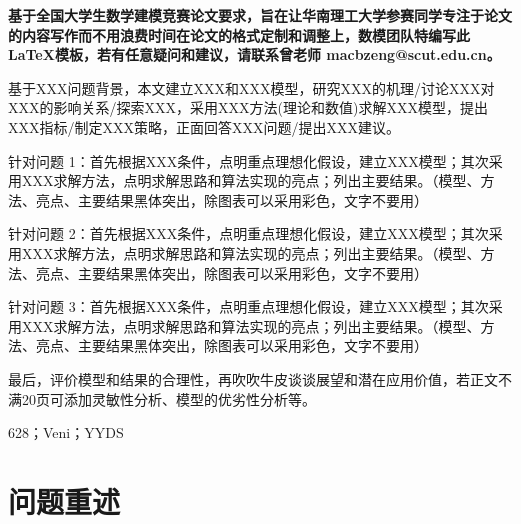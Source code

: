 \documentclass[12pt,utf8]{article}
\begin{document}

\begin{center} 
   \bfseries{}
   \vspace{2ex}
   
   \bfseries{}
\end{center}


\textbf{基于全国大学生数学建模竞赛论文要求，旨在让华南理工大学参赛同学专注于论文的内容写作而不用浪费时间在论文的格式定制和调整上，数模团队特编写此 \LaTeX 模板，若有任意疑问和建议，请联系曾老师 macbzeng@scut.edu.cn。\color{blue}{Veni修改内容：修正原模板中的dkgreen颜色报错；修正原模板中插入代码的时候单行代码过长而无法显示；改变附录代码插入格式，改为lstinputlisting，直接输入文件名，不必再CV；改变文献引用格式，采用gbt7714-2015格式，同时修正了开源模板中的学位论文出现[出版社不详]的问题；修正目录与ref的颜色冲突。应该没有bug了吧。}}

基于XXX问题背景，本文建立XXX和XXX模型，研究XXX的机理/讨论XXX对XXX的影响关系/探索XXX，采用XXX方法(理论和数值)求解XXX模型，提出XXX指标/制定XXX策略，正面回答XXX问题/提出XXX建议。

针对问题 1：首先根据XXX条件，点明重点理想化假设，建立XXX模型；其次采用XXX求解方法，点明求解思路和算法实现的亮点；列出主要结果。（模型、方法、亮点、主要结果黑体突出，除图表可以采用彩色，文字不要用）

针对问题 2：首先根据XXX条件，点明重点理想化假设，建立XXX模型；其次采用XXX求解方法，点明求解思路和算法实现的亮点；列出主要结果。（模型、方法、亮点、主要结果黑体突出，除图表可以采用彩色，文字不要用）

针对问题 3：首先根据XXX条件，点明重点理想化假设，建立XXX模型；其次采用XXX求解方法，点明求解思路和算法实现的亮点；列出主要结果。（模型、方法、亮点、主要结果黑体突出，除图表可以采用彩色，文字不要用）

最后，评价模型和结果的合理性，再吹吹牛皮谈谈展望和潜在应用价值，若正文不满20页可添加灵敏性分析、模型的优劣性分析等。


\vspace{2ex}

 628；Veni；YYDS



\newpage

\begin{center}
	\tableofcontents
\end{center}
\newpage

\section{问题重述}
\end{document}
